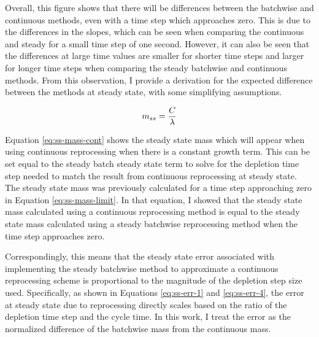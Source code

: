 Overall, this figure shows that there will be differences between the batchwise and continuous methods, even with a time step which approaches zero. This is due to the differences in the slopes, which can be seen when comparing the continuous and steady for a small time step of one second. However, it can also be seen that the differences at large time values are smaller for shorter time steps and larger for longer time steps when comparing the steady batchwise and continuous methods. From this observation, I provide a derivation for the expected difference between the methods at steady state, with some simplifying assumptions.

\begin{equation} \hfill 
m_{ss} = \frac{C}{\lambda}
\hfill\label{eq:ss-mass-cont} \end{equation}

Equation \eqref{eq:ss-mass-cont} shows the steady state mass which will appear when using continuous reprocessing when there is a constant growth term. This can be set equal to the steady batch steady state term to solve for the depletion time step needed to match the result from continuous reprocessing at steady state. 
The steady state mass was previously calculated for a time step approaching zero in Equation \eqref{eq:ss-mass-limit}.
In that equation, I showed that the steady state mass calculated using a continuous reprocessing method is equal to the steady state mass calculated using a steady batchwise reprocessing method when the time step approaches zero.


Correspondingly, this means that the steady state error associated with implementing the steady batchwise method to approximate a continuous reprocessing scheme is proportional to the magnitude of the depletion step size used. Specifically, as shown in Equations \eqref{eq:ss-err-1} and \eqref{eq:ss-err-4}, the error at steady state due to reprocessing directly scales based on the ratio of the depletion time step and the cycle time. In this work, I treat the error as the normalized difference of the batchwise mass from the continuous mass.

